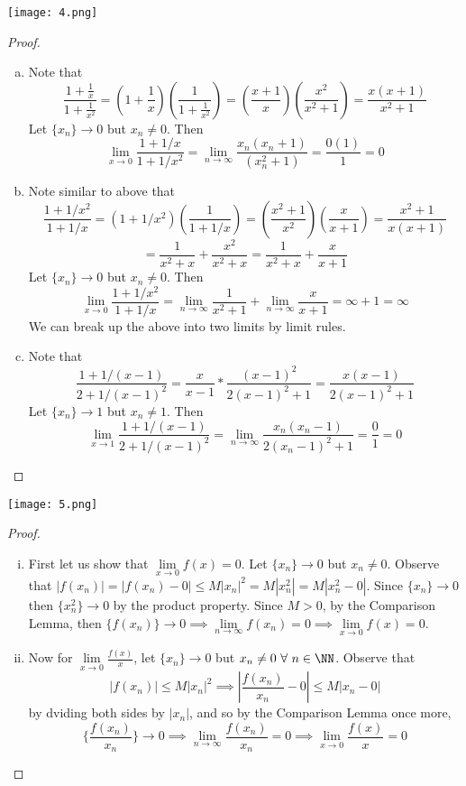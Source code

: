 \documentclass[12pt]{scrartcl}
\begin{document}
\newpage 

\texttt{[image: 4.png]}

\begin{proof}

\hfill

\begin{enumerate}[a.]
  \item Note that 
  \[\frac{1 + \frac{1}{x}}{1 + \frac{1}{x^2}} = (1 + \frac{1}{x})(\frac{1}{1 + \frac{1}{x^2}}) = (\frac{x + 1}{x})(\frac{x^2}{x^2 + 1}) = \frac{x(x+1)}{x^2 + 1}\]
  Let $\{x_n\} \to 0$ but $x_n \neq 0$. Then 
  \[\lim_{x\to 0} \frac{1 + 1/x}{1 + 1/x^2} = \lim_{n\to\infty} \frac{x_n(x_n + 1)}{(x_n^2 + 1)} = \frac{0(1)}{1} = 0\]
  \item Note similar to above that 
  \[\frac{1 + 1/x^2}{1 + 1/x} = (1 + 1/x^2)(\frac{1}{1 + 1/x}) = (\frac{x^2 + 1}{x^2})(\frac{x}{x + 1}) = \frac{x^2 + 1}{x(x+1)}\] 
  \[= \frac{1}{x^2 + x} + \frac{x^2}{x^2 + x} = \frac{1}{x^2 + x} + \frac{x}{x + 1}\]
  Let $\{x_n\} \to 0$ but $x_n \neq 0$. Then 
  \[\lim_{x \to 0} \frac{1 + 1/x^2}{1 + 1/x} = \lim_{n\to\infty} \frac{1}{x^2 + 1} + \lim_{n\to\infty} \frac{x}{x+1} = \infty + 1 = \infty\]
  We can break up the above into two limits by limit rules.
  \item Note that 
  \[\frac{1 + 1/(x-1)}{2 + 1/(x-1)^2} = \frac{x}{x-1} * \frac{(x-1)^2}{2(x-1)^2 + 1} = \frac{x(x-1)}{2(x-1)^2 + 1}\]
  Let $\{x_n\} \to 1$ but $x_n \neq 1$. Then 
  \[\lim_{x\to 1} \frac{1 + 1/(x-1)}{2 + 1/(x-1)^2} = \lim_{n\to\infty} \frac{x_n(x_n - 1)}{2(x_n-1)^2 + 1} = \frac{0}{1} = 0\]

\end{enumerate}

\end{proof}

\newpage 

\texttt{[image: 5.png]}

\begin{proof}

\hfill

\begin{enumerate}[i.]
  \item First let us show that $\underset{x\to 0}{\lim}f(x) = 0$. Let $\{x_n\} \to 0$ but $x_n \neq 0$.
  Observe that $|f(x_n)| = |f(x_n) - 0| \leq M|x_n|^2 = M|x_n^2| = M|x_n^2 - 0|$. Since $\{x_n\} \to 0$ then 
  $\{x_n^2\} \to 0$ by the product property. Since $M > 0$, by the Comparison Lemma, 
  then $\{f(x_n)\} \to 0 \implies \underset{n\to\infty}{\lim}f(x_n) = 0 \implies \underset{x\to 0}{\lim}f(x) = 0$.
  \item Now for $\underset{x\to 0}{\lim}\frac{f(x)}{x}$, let $\{x_n\}\to 0$ but $x_n \neq 0 \ \forall \ n \in \NN$. 
  Observe that 
  \[|f(x_n)| \leq M|x_n|^2 \implies |\frac{f(x_n)}{x_n} - 0| \leq M|x_n - 0|\]
  by dviding both sides by $|x_n|$, and so by the Comparison Lemma once more, 
  \[\{\frac{f(x_n)}{x_n}\} \to 0 \implies \lim_{n\to\infty}\frac{f(x_n)}{x_n} = 0 \implies \lim_{x\to 0}\frac{f(x)}{x} =0\]
\end{enumerate}

\end{proof}
\end{document}
